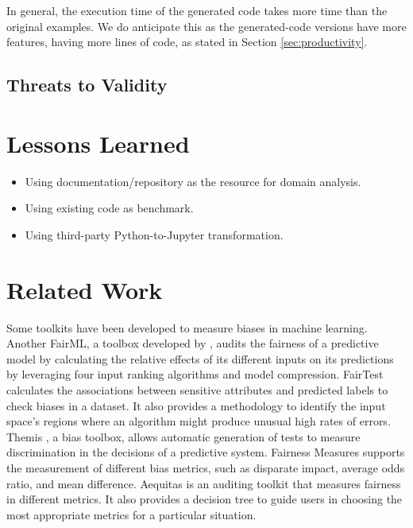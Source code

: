 \documentclass[sigconf,review]{acmart}
\begin{document}
In general, the execution time of the generated code takes more time than the original examples. 
We do anticipate this as the generated-code versions have more features, having more lines of code,
as stated in Section \ref{sec:productivity}. 

\subsection{Threats to Validity}
\label{sec:threats_to_validity}



\section{Lessons Learned}
\label{sec:lessons_learned}

\begin{itemize}
	\item Using documentation/repository as the resource for domain analysis. 
	\item Using existing code as benchmark.
	\item Using third-party Python-to-Jupyter transformation.
\end{itemize}


\section{Related Work}
\label{sec:related_work}


Some toolkits have been developed to measure biases in machine learning. 
Another FairML, a toolbox developed by \cite{adebayo2016fairml}, audits the fairness of a predictive model by calculating the relative effects of its different inputs on its predictions by leveraging four input ranking algorithms and model compression. 
FairTest \cite{tramer2017fairtest} calculates the associations between sensitive attributes and predicted labels to check biases in a dataset. It also provides a methodology to identify the input space's regions where an algorithm might produce unusual high rates of errors.
Themis \cite{galhotra2017themis}, a bias toolbox, allows automatic generation of tests to measure discrimination in the decisions of a predictive system.
Fairness Measures \cite{zehlike2017fairness} supports the measurement of different bias metrics, such as disparate impact, average odds ratio, and mean difference. 
Aequitas \cite{saleiro2019aequitas} is an auditing toolkit that measures fairness in different metrics. It also provides a decision tree to guide users in choosing the most appropriate metrics for a particular situation. 
\end{document}
